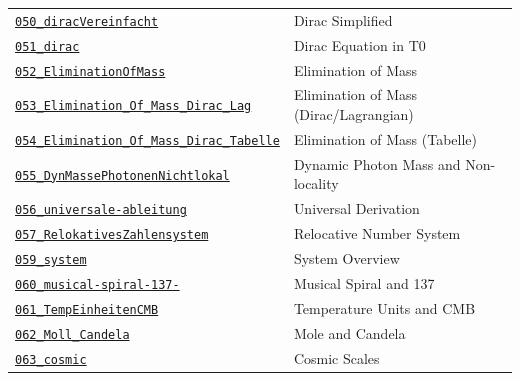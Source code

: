 {\begin{longtable}{@{}>{\raggedright\arraybackslash}p{} >{\raggedright\arraybackslash}p{}@{}}
\href{https://github.com/jpascher/T0-Time-Mass-Duality/blob/main/2/pdf/050_diracVereinfacht_De.pdf}{\texttt{050\_diracVereinfacht}} & Dirac Simplified \\
\href{https://github.com/jpascher/T0-Time-Mass-Duality/blob/main/2/pdf/051_dirac_De.pdf}{\texttt{051\_dirac}} & Dirac Equation in T0 \\
\href{https://github.com/jpascher/T0-Time-Mass-Duality/blob/main/2/pdf/052_EliminationOfMass_De.pdf}{\texttt{052\_EliminationOfMass}} & Elimination of Mass \\
\href{https://github.com/jpascher/T0-Time-Mass-Duality/blob/main/2/pdf/053_Elimination_Of_Mass_Dirac_Lag_De.pdf}{\texttt{053\_Elimination\_Of\_Mass\_Dirac\_Lag}} & Elimination of Mass (Dirac/Lagrangian) \\
\href{https://github.com/jpascher/T0-Time-Mass-Duality/blob/main/2/pdf/054_Elimination_Of_Mass_Dirac_Tabelle_De.pdf}{\texttt{054\_Elimination\_Of\_Mass\_Dirac\_Tabelle}} & Elimination of Mass (Tabelle) \\
\href{https://github.com/jpascher/T0-Time-Mass-Duality/blob/main/2/pdf/055_DynMassePhotonenNichtlokal_De.pdf}{\texttt{055\_DynMassePhotonenNichtlokal}} & Dynamic Photon Mass and Non-locality \\
\href{https://github.com/jpascher/T0-Time-Mass-Duality/blob/main/2/pdf/056_universale-ableitung_De.pdf}{\texttt{056\_universale-ableitung}} & Universal Derivation \\
\href{https://github.com/jpascher/T0-Time-Mass-Duality/blob/main/2/pdf/057_RelokativesZahlensystem_De.pdf}{\texttt{057\_RelokativesZahlensystem}} & Relocative Number System \\
\href{https://github.com/jpascher/T0-Time-Mass-Duality/blob/main/2/pdf/059_system_De.pdf}{\texttt{059\_system}} & System Overview \\
\href{https://github.com/jpascher/T0-Time-Mass-Duality/blob/main/2/pdf/060_musical-spiral-137-_De.pdf}{\texttt{060\_musical-spiral-137-}} & Musical Spiral and 137 \\
\href{https://github.com/jpascher/T0-Time-Mass-Duality/blob/main/2/pdf/061_TempEinheitenCMB_De.pdf}{\texttt{061\_TempEinheitenCMB}} & Temperature Units and CMB \\
\href{https://github.com/jpascher/T0-Time-Mass-Duality/blob/main/2/pdf/062_Moll_Candela_De.pdf}{\texttt{062\_Moll\_Candela}} & Mole and Candela \\
\href{https://github.com/jpascher/T0-Time-Mass-Duality/blob/main/2/pdf/063_cosmic_De.pdf}{\texttt{063\_cosmic}} & Cosmic Scales \\

\end{longtable}}
